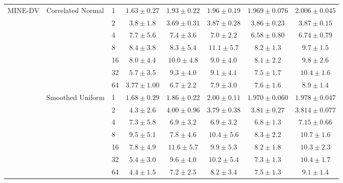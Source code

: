 \begin{tabular}{lllccccc}
\cmidrule{1-8} \cmidrule{2-8}
\multirow[l]{14}{*}{MINE-DV} & \multirow[l]{7}{*}{Correlated Normal} & 1 & $1.63 \pm 0.27$ & $1.93 \pm 0.22$ & $1.96 \pm 0.19$ & $1.969 \pm 0.076$ & $2.006 \pm 0.045$ \\
 &  & 2 & $3.8 \pm 1.8$ & $3.69 \pm 0.31$ & $3.87 \pm 0.28$ & $3.86 \pm 0.23$ & $3.87 \pm 0.15$ \\
 &  & 4 & $7.7 \pm 5.6$ & $7.4 \pm 3.6$ & $7.0 \pm 2.2$ & $6.58 \pm 0.80$ & $6.74 \pm 0.79$ \\
 &  & 8 & $8.4 \pm 3.8$ & $8.3 \pm 5.4$ & $11.1 \pm 5.7$ & $8.2 \pm 1.3$ & $9.7 \pm 1.5$ \\
 &  & 16 & $8.0 \pm 4.4$ & $10.0 \pm 4.8$ & $9.0 \pm 4.0$ & $8.1 \pm 2.2$ & $9.8 \pm 2.6$ \\
 &  & 32 & $5.7 \pm 3.5$ & $9.3 \pm 4.0$ & $9.1 \pm 4.1$ & $7.5 \pm 1.7$ & $10.4 \pm 1.6$ \\
 &  & 64 & $3.77 \pm 1.00$ & $6.7 \pm 2.2$ & $7.9 \pm 3.0$ & $7.6 \pm 1.6$ & $8.9 \pm 1.4$ \\
\cmidrule{2-8}
 & \multirow[l]{7}{*}{Smoothed Uniform} & 1 & $1.68 \pm 0.29$ & $1.86 \pm 0.22$ & $2.00 \pm 0.11$ & $1.970 \pm 0.060$ & $1.978 \pm 0.047$ \\
 &  & 2 & $4.3 \pm 2.6$ & $4.00 \pm 0.96$ & $3.79 \pm 0.38$ & $3.81 \pm 0.27$ & $3.814 \pm 0.077$ \\
 &  & 4 & $7.3 \pm 5.8$ & $6.9 \pm 3.2$ & $6.9 \pm 3.2$ & $6.8 \pm 1.3$ & $7.15 \pm 0.66$ \\
 &  & 8 & $9.5 \pm 5.1$ & $7.8 \pm 4.6$ & $10.4 \pm 5.6$ & $8.3 \pm 2.2$ & $10.7 \pm 1.6$ \\
 &  & 16 & $7.8 \pm 4.9$ & $11.6 \pm 5.7$ & $9.9 \pm 5.3$ & $8.2 \pm 1.8$ & $10.3 \pm 2.3$ \\
 &  & 32 & $5.4 \pm 3.0$ & $9.6 \pm 4.0$ & $10.2 \pm 5.4$ & $7.3 \pm 1.3$ & $10.4 \pm 1.7$ \\
 &  & 64 & $4.4 \pm 1.5$ & $7.2 \pm 2.5$ & $8.2 \pm 3.4$ & $7.5 \pm 1.3$ & $9.1 \pm 1.4$ \\
\cmidrule{1-8} \bottomrule
\end{tabular}
